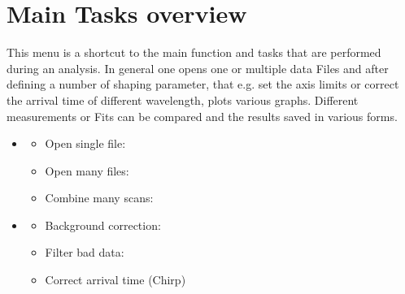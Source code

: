 \documentclass[letterpaper,10pt,english]{sphinxmanual}
\begin{document}
\chapter{Main Tasks overview}
\label{\detokenize{Main_tasks:main-tasks-overview}}\label{\detokenize{Main_tasks::doc}}
This menu is a shortcut to the main function and tasks that are performed during an analysis.
In general one opens one or multiple data Files and after defining a number of shaping parameter, that
e.g. set the axis limits or correct the arrival time of different wavelength,  plots various graphs.
Different measurements or Fits can be compared and the results saved in various forms.
\begin{itemize}
\item {} 
{\hyperref[\detokenize{Opening:opening-of-data}]{}}
\begin{itemize}
\item {} 
Open single file:                     {\hyperref[\detokenize{plot_func:plot_func.TA.__init__}]{}}

\item {} 
Open many files:                              {\hyperref[\detokenize{plot_func:plot_func.GUI_open}]{}}

\item {} 
Combine many scans:                   {\hyperref[\detokenize{plot_func:plot_func.Summarize_scans}]{}}

\end{itemize}

\item {} 
{\hyperref[\detokenize{Shaping:shaping-of-data}]{}}
\begin{itemize}
\item {} 
Background correction:                        {\hyperref[\detokenize{plot_func:plot_func.TA.Background}]{}}

\item {} 
Filter bad data:                              {\hyperref[\detokenize{plot_func:plot_func.TA.Filter_data}]{}}

\item {} 
Correct arrival time (Chirp)  {\hyperref[\detokenize{plot_func:plot_func.TA.Cor_Chirp}]{}}


\end{itemize}
\end{itemize}
\end{document}
